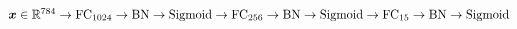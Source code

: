 $\vect{x} \in \real^{784} \newline
	\rightarrow \text{FC}_{1024} \rightarrow \text{BN} \rightarrow \text{Sigmoid} \newline
	\rightarrow \text{FC}_{256} \rightarrow \text{BN} \rightarrow \text{Sigmoid} \newline
	\rightarrow \text{FC}_{15} \rightarrow \text{BN} \rightarrow \text{Sigmoid} \newline$